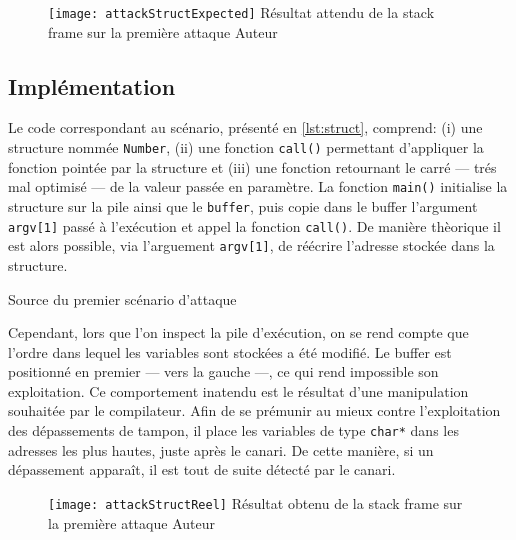 \begin{figure}[H]
	\centering
	\texttt{[image: attackStructExpected]}
	{Résultat attendu de la \og stack frame \fg sur la première attaque}
	{Auteur}
	\label{fig:attackStructExpected}
\end{figure}

\subsection{Implémentation}

Le code correspondant au scénario, présenté en \autoref{lst:struct}, comprend: (i) une structure nommée \texttt{Number}, (ii) une fonction \texttt{call()} permettant d'appliquer la fonction pointée par la structure et (iii) une fonction retournant le carré --- trés mal optimisé --- de la valeur passée en paramètre. La fonction \texttt{main()} initialise la structure sur la pile ainsi que le \texttt{buffer}, puis copie dans le buffer l'argument \texttt{argv[1]} passé à l'exécution et appel la fonction \texttt{call()}. De manière thèorique il est alors possible, via l'arguement \texttt{argv[1]}, de réécrire l'adresse stockée dans la structure.

\begin{listing}
	\caption{Source du premier scénario d'attaque}
	\label{lst:struct}
\end{listing}

Cependant, lors que l'on inspect la pile d'exécution, on se rend compte que l'ordre dans lequel les variables sont stockées a été modifié. Le \og buffer \fg est positionné en premier --- vers la gauche ---, ce qui rend impossible son exploitation. Ce comportement inatendu est le résultat d'une manipulation souhaitée par le compilateur. Afin de se prémunir au mieux contre l'exploitation des dépassements de tampon, il place les variables de type \texttt{char*} dans les adresses les plus hautes, juste après le canari. De cette manière, si un dépassement apparaît, il est tout de suite détecté par le canari.

\begin{figure}[H]
	\centering
	\texttt{[image: attackStructReel]}
	{Résultat obtenu de la \og stack frame \fg sur la première attaque}
	{Auteur}
	\label{fig:attackStructReel}
\end{figure}

